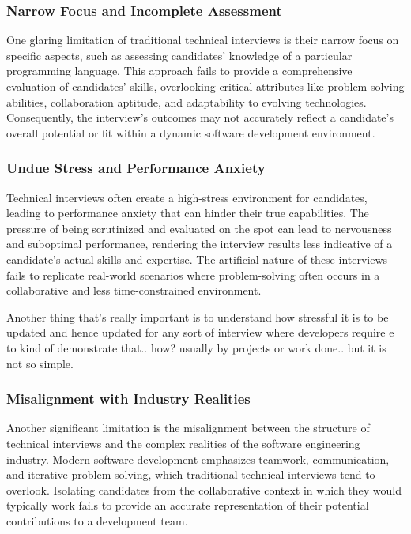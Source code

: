 \documentclass[
    a4paper, %
    10pt, %
    unnumberedsections, %
    twoside, %
]{LTJournalArticle}
\begin{document}
\subsubsection*{Narrow Focus and Incomplete Assessment}

One glaring limitation of traditional technical interviews is their narrow focus on specific aspects, such as assessing candidates' knowledge of a particular programming language. This approach fails to provide a comprehensive evaluation of candidates' skills, overlooking critical attributes like problem-solving abilities, collaboration aptitude, and adaptability to evolving technologies. Consequently, the interview's outcomes may not accurately reflect a candidate's overall potential or fit within a dynamic software development environment.

\subsubsection*{Undue Stress and Performance Anxiety}

Technical interviews often create a high-stress environment for candidates, leading to performance anxiety that can hinder their true capabilities. The pressure of being scrutinized and evaluated on the spot can lead to nervousness and suboptimal performance, rendering the interview results less indicative of a candidate's actual skills and expertise. The artificial nature of these interviews fails to replicate real-world scenarios where problem-solving often occurs in a collaborative and less time-constrained environment.



Another thing that's really important is to understand how stressful it is to be updated and hence updated for any sort of interview where developers require e to kind of demonstrate that.. how? usually by projects or work done.. but it is not so simple.  


\subsubsection*{Misalignment with Industry Realities}

Another significant limitation is the misalignment between the structure of technical interviews and the complex realities of the software engineering industry. Modern software development emphasizes teamwork, communication, and iterative problem-solving, which traditional technical interviews tend to overlook. Isolating candidates from the collaborative context in which they would typically work fails to provide an accurate representation of their potential contributions to a development team.
\end{document}
